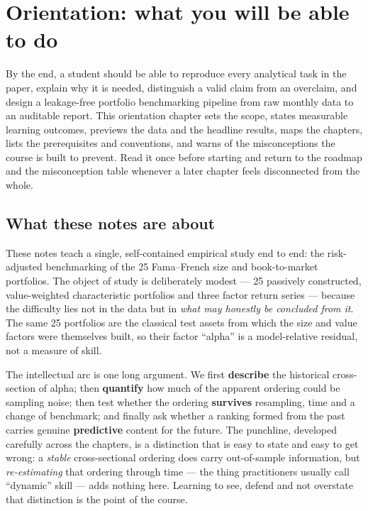 \hypertarget{orientation}{}
\hypertarget{orientation-what-you-will-be-able-to-do}{%
\chapter{Orientation: what you will be able to
do}\label{orientation-what-you-will-be-able-to-do}}

By the end, a student should be able to reproduce every analytical task
in the paper, explain why it is needed, distinguish a valid claim from
an overclaim, and design a leakage-free portfolio benchmarking pipeline
from raw monthly data to an auditable report. This orientation chapter
sets the scope, states measurable learning outcomes, previews the data
and the headline results, maps the chapters, lists the prerequisites and
conventions, and warns of the misconceptions the course is built to
prevent. Read it once before starting and return to the roadmap and the
misconception table whenever a later chapter feels disconnected from the
whole.

\hypertarget{what-these-notes-are-about}{%
\section{What these notes are about}\label{what-these-notes-are-about}}

These notes teach a single, self-contained empirical study end to end:
the risk-adjusted benchmarking of the 25 Fama--French size and
book-to-market portfolios. The object of study is deliberately modest ---
25 passively constructed, value-weighted characteristic portfolios and
three factor return series --- because the difficulty lies not in the
data but in \emph{what may honestly be concluded from it}. The same 25
portfolios are the classical test assets from which the size and value
factors were themselves built, so their factor ``alpha'' is a
model-relative residual, not a measure of skill.

The intellectual arc is one long argument. We first \textbf{describe}
the historical cross-section of alpha; then \textbf{quantify} how much of
the apparent ordering could be sampling noise; then test whether the
ordering \textbf{survives} resampling, time and a change of benchmark;
and finally ask whether a ranking formed from the past carries genuine
\textbf{predictive} content for the future. The punchline, developed
carefully across the chapters, is a distinction that is easy to state and
easy to get wrong: a \emph{stable} cross-sectional ordering does carry
out-of-sample information, but \emph{re-estimating} that ordering through
time --- the thing practitioners usually call ``dynamic'' skill --- adds
nothing here. Learning to see, defend and not overstate that distinction
is the point of the course.

